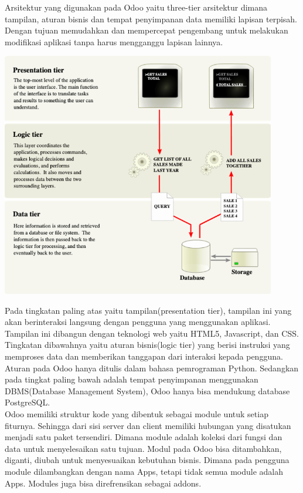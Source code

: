 Arsitektur yang digunakan pada Odoo yaitu three-tier arsitektur dimana tampilan, aturan bisnis dan tempat penyimpanan data memiliki lapisan terpisah. Dengan tujuan memudahkan dan mempercepat pengembang untuk melakukan modifikasi aplikasi tanpa harus mengganggu lapisan lainnya.\\

\begin{center}
	\includegraphics[width=12cm]{img/arsitekturOdoo.PNG}
	\label{fig:asd}
\end{center}

Pada tingkatan paling atas yaitu tampilan(presentation tier), tampilan ini yang akan berinteraksi langsung dengan pengguna yang menggunakan aplikasi. Tampilan ini dibangun dengan teknologi web yaitu HTML5, Javascript, dan CSS. Tingkatan dibawahnya yaitu aturan bisnis(logic tier) yang berisi instruksi yang memproses data dan memberikan tanggapan dari interaksi kepada pengguna. Aturan pada Odoo hanya ditulis dalam bahasa pemrograman Python. Sedangkan pada tingkat paling bawah adalah tempat penyimpanan menggunakan DBMS(Database Management System), Odoo hanya bisa mendukung database PostgreSQL.\\

Odoo memiliki struktur kode yang dibentuk sebagai module untuk setiap fiturnya. Sehingga dari sisi server dan client memiliki hubungan yang disatukan menjadi satu paket tersendiri. Dimana module adalah koleksi dari fungsi dan data untuk menyelesaikan satu tujuan. Modul pada Odoo bisa ditambahkan, diganti, diubah untuk menyesuaikan kebutuhan bisnis. Dimana pada pengguna module dilambangkan dengan nama Apps, tetapi tidak semua module adalah Apps. Modules juga bisa direfrensikan sebagai addons.\\

